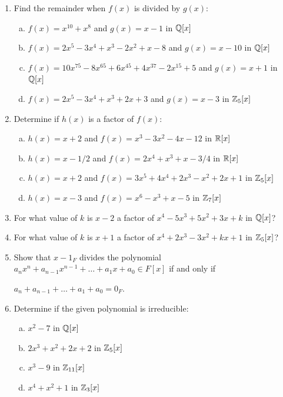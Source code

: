 \documentclass[11pt,fleqn,dvipsnames,usenames]{article}
\begin{document}
\begin{enumerate}[1.]
\item Find the remainder when $f(x)$ is divided by $g(x)$:
\begin{enumerate}[(a)]
\item $f(x) = x^{10} + x^8$ and $g(x) = x -1$ in $\mathbb{Q}[x]$
\item $f(x) = 2x^5 - 3x^4 + x^3 - 2x^2 + x - 8$ and $g(x) = x - 10$ in $\mathbb{Q}[x]$
\item $f(x) = 10x^{75} - 8x^{65} + 6x^{45} + 4x^{37} - 2x^{15} + 5$ and $g(x) = x + 1$ in $\mathbb{Q}[x]$
\item $f(x) = 2x^5 - 3x^4 + x^3 + 2x + 3$ and $g(x) = x - 3$ in $\mathbb{Z}_{5}[x]$
\end{enumerate}

\item Determine if $h(x)$ is a factor of $f(x)$:
\begin{enumerate}[(a)]
\item $h(x) = x + 2$ and $f(x) = x^3 - 3x^2 - 4x - 12$ in $\mathbb{R}[x]$
\item $h(x) = x - 1/2$ and $f(x) = 2x^4 + x^3 + x - 3/4$ in $\mathbb{R}[x]$
\item $h(x) = x + 2$ and $f(x) = 3x^5 + 4x^4 + 2x^3 - x^2 + 2x + 1$ in $\mathbb{Z}_{5}[x]$
\item $h(x) = x - 3$ and $f(x) = x^6 - x^3 + x - 5$ in $\mathbb{Z}_{7}[x]$
\end{enumerate}

\item For what value of $k$ is $x-2$ a factor of $x^4 - 5x^3 + 5x^2 + 3x + k$ in $\mathbb{Q}[x]$?

\item For what value of $k$ is $x+1$ a factor of $x^4 + 2x^3 - 3x^2 + kx + 1$ in $\mathbb{Z}_{5}[x]$?

\item Show that $x -1_{F}$ divides the polynomial $a_{n}x^{n} + a_{n-1}x^{n-1} + \ldots + a_{1}x + a_{0}\in F[x]$ if and only if
\begin{center}
$a_{n} + a_{n-1} + \ldots + a_{1} + a_{0} = 0_{F}$.
\end{center}

\item Determine if the given polynomial is irreducible:
\begin{enumerate}[(a)]
\item $x^2 - 7$ in $\mathbb{Q}[x]$
\item $2x^3 + x^2 + 2x + 2$ in $\mathbb{Z}_{5}[x]$
\item $x^3 - 9$ in $\mathbb{Z}_{11}[x]$
\item $x^4 + x^2 + 1$ in $\mathbb{Z}_{3}[x]$
\end{enumerate}



\end{enumerate}
\end{document}
